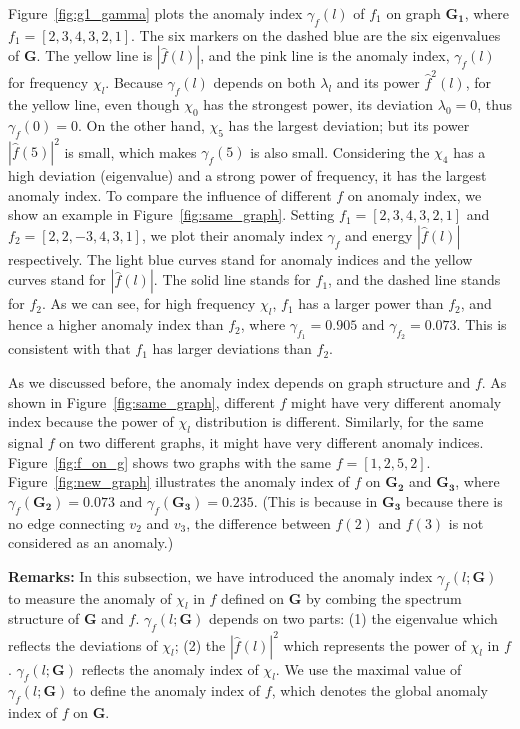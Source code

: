 \documentclass[twoside,leqno,twocolumn]{article}
\begin{document}
Figure~\ref{fig:g1_gamma} plots the anomaly index $\gamma_f(l)$ of $f_1$ on graph $\mathbf{G_1}$, where $f_1=[2,3,4,3,2,1]$. The six markers on the dashed blue are the six eigenvalues of $\mathbf{G}$. The yellow line is $|\hat{f}(l)|$, and the pink line is the anomaly index, $\gamma_f(l)$ for frequency $\chi_l$. Because $\gamma_f(l)$ depends on both $\lambda_l$ and its power $\hat{f}^2(l)$, for the yellow line, even though $\chi_0$ has the strongest power, its deviation $\lambda_0 = 0$, thus $\gamma_f(0)=0$. On the other hand, $\chi_5$ has the largest deviation; but its power $|\hat{f}(5)|^2$ is small, which makes $\gamma_f(5)$ is also small. Considering the $\chi_4$ has a high deviation (eigenvalue) and a strong power of frequency, it has the largest anomaly index. To compare the influence of different $f$ on anomaly index, we show an example in Figure~\ref{fig:same_graph}. Setting $f_1=[2,3,4,3,2,1]$ and $f_2=[2,2,-3,4,3,1]$, we plot their anomaly index $\gamma_{f}$ and energy $|\hat{f}(l)|$ respectively.
The light blue curves stand for anomaly indices and the
yellow curves stand for $|\hat{f}(l)|$. The solid line stands for $f_1$, and the
dashed line stands for $f_2$. As we can see, for high frequency $\chi_l$, $f_1$ has a larger power than $f_2$, and hence a higher anomaly index than $f_2$, where $\gamma_{f_1}=0.905$ and $\gamma_{f_2}=0.073$. This is consistent with that $f_1$ has larger deviations than $f_2$.

As we discussed before, the anomaly index depends on graph structure and $f$. As shown in Figure~\ref{fig:same_graph}, different $f$ might have very different anomaly index because the power of $\chi_l$ distribution is different. Similarly, for the same signal $f$ on two different graphs, it might have very different anomaly indices. Figure~\ref{fig:f_on_g} shows two graphs with the same $f=[1,2,5,2]$. Figure~\ref{fig:new_graph} illustrates the anomaly index of $f$ on $\mathbf{G_2}$ and $\mathbf{G_3}$, where $\gamma_{f}(\mathbf{G_2})=0.073$ and $\gamma_{f}(\mathbf{G_3})=0.235$. (This is because in $\mathbf{G_3}$ because there is no edge connecting $v_2$ and $v_3$, the difference between $f(2)$ and $f(3)$ is not considered as an anomaly.)


{\textbf{Remarks:}}
In this subsection, we have introduced the anomaly index $\gamma_f(l;\mathbf{G})$ to measure the anomaly of $\chi_l$ in $f$ defined on $\mathbf{G}$ by combing the spectrum structure of $\mathbf{G}$ and $f$. $\gamma_f(l;\mathbf{G})$ depends on two parts: (1) the eigenvalue which reflects the deviations of $\chi_l$; (2) the $|\hat{f}(l)|^2$  which represents the power of $\chi_l$ in $f$. $\gamma_f(l;\mathbf{G})$ reflects the anomaly index of $\chi_l$. We use the maximal value of $\gamma_f(l;\mathbf{G})$ to define the anomaly index of $f$, which denotes the global anomaly index of $f$ on $\mathbf{G}$.
\end{document}
